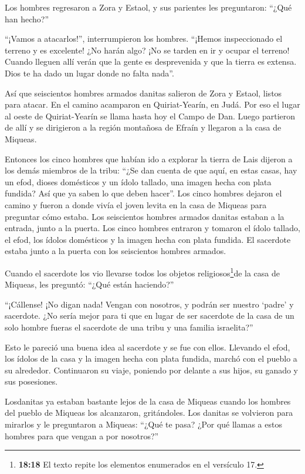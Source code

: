  Los hombres regresaron a Zora y Estaol, y sus parientes les
preguntaron: ``¿Qué han hecho?''

 ``¡Vamos a atacarlos!'', interrumpieron los hombres.
``¡Hemos inspeccionado el terreno y es excelente! ¿No harán algo? ¡No se
tarden en ir y ocupar el terreno!  Cuando lleguen allí
verán que la gente es desprevenida y que la tierra es extensa. Dios te
ha dado un lugar donde no falta nada''.

 Así que seiscientos hombres armados danitas salieron de
Zora y Estaol, listos para atacar.  En el camino acamparon
en Quiriat-Yearín, en Judá. Por eso el lugar al oeste de Quiriat-Yearín
se llama hasta hoy el Campo de Dan.  Luego partieron de
allí y se dirigieron a la región montañosa de Efraín y llegaron a la
casa de Miqueas.

 Entonces los cinco hombres que habían ido a explorar la
tierra de Lais dijeron a los demás miembros de la tribu: ``¿Se dan
cuenta de que aquí, en estas casas, hay un efod, dioses domésticos y un
ídolo tallado, una imagen hecha con plata fundida? Así que ya saben lo
que deben hacer''.  Los cinco hombres dejaron el camino y
fueron a donde vivía el joven levita en la casa de Miqueas para
preguntar cómo estaba.  Los seiscientos hombres armados
danitas estaban a la entrada, junto a la puerta.  Los cinco
hombres entraron y tomaron el ídolo tallado, el efod, los ídolos
domésticos y la imagen hecha con plata fundida. El sacerdote estaba
junto a la puerta con los seiscientos hombres armados.

 Cuando el sacerdote los vio llevarse todos los objetos
religiosos\footnote{\textbf{18:18} El texto repite los elementos
  enumerados en el versículo 17.}de la casa de Miqueas, les preguntó:
``¿Qué están haciendo?''

 ``¡Cállense! ¡No digan nada! Vengan con nosotros, y podrán
ser nuestro `padre' y sacerdote. ¿No sería mejor para ti que en lugar de
ser sacerdote de la casa de un solo hombre fueras el sacerdote de una
tribu y una familia israelita?''

 Esto le pareció una buena idea al sacerdote y se fue con
ellos. Llevando el efod, los ídolos de la casa y la imagen hecha con
plata fundida, marchó con el pueblo a su alrededor. 
Continuaron su viaje, poniendo por delante a sus hijos, su ganado y sus
posesiones.

 Losdanitas ya estaban bastante lejos de la casa de Miqueas
cuando los hombres del pueblo de Miqueas los alcanzaron, 
gritándoles. Los danitas se volvieron para mirarlos y le preguntaron a
Miqueas: ``¿Qué te pasa? ¿Por qué llamas a estos hombres para que vengan
a por nosotros?''

